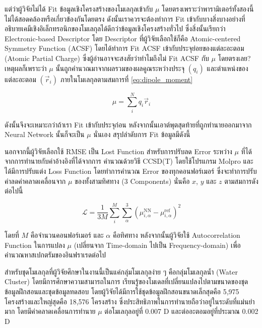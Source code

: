 แต่ว่าผู้วิจัยไม่ได้ Fit ข้อมูลเชิงโครงสร้างของโมเลกุลเข้ากับ $\mu$ โดยตรงเพราะว่าพารามิเตอร์ทั้งสองนี้ไม่ได้สอดคล้องหรือเกี่ยวข้องกันโดยตรง 
ดังนั้นเราควรจะต้องทำการ Fit เข้ากับบางสิ่งบางอย่างที่อธิบายเคมีเชิงอิเล็กทรอนิกของโมเลกุลได้ดีกว่าข้อมูลเชิงโครงสร้างทั่วไป ซึ่งสิ่งนั้นเรียกว่า 
Electronic-based Descriptor โดย Descriptor ที่ผู้วิจัยเลือกใช้ก็คือ Atomic-centered Symmetry Function (ACSF) โดยได้ทำการ 
Fit ACSF เข้ากับประจุย่อยของแต่ละอะตอม (Atomic Partial Charge) ซึ่งผู้อ่านอาจจะสงสัยว่าทำไมถึงไม่ Fit ACSF กับ $\mu$ โดยตรงเลย? 
เหตุผลก็เพราะว่า $\mu$ นั้นถูกคำนวณมาจากผลรวมของผลคูณระหว่างประจุ $(q_{i})$ และตำแหน่งของแต่ละอะตอม $(\vec{r}_{i})$ 
ภายในโมเลกุลตามสมการที่ \ref{eq:dipole_moment}

\begin{equation}\label{eq:dipole_moment}
    \mu = \sum^{N}_{i} q_{i}\vec{r}_{i}
\end{equation}

\noindent ดังนั้นจึงจะเหมาะกว่าถ้าเรา Fit เข้ากับประจุก่อน หลังจากนั้นเอาต์พุตสุดท้ายที่ถูกทำนายออกมาจาก Neural Network นั้นก็จะเป็น 
$\mu$ นั่นเอง สรุปลำดับการ Fit ข้อมูลมีดังนี้ 


นอกจากนี้ผู้วิจัยเลือกใช้ RMSE เป็น Lost Function สำหรับการปรับลด Error ระหว่าง $\mu$ ที่ได้จากการทำนายกับค่าอ้างอิงที่ได้จากการ%
คำนวณด้วยวิธี CCSD(T) โดยใช้โปรแกรม Molpro และได้มีการปรับแต่ง Loss Function โดยทำการคำนวณ Error ของทุกคอนฟอร์เมอร์ 
ซึ่งจะทำการปรับค่าลดค่าคลาดเคลื่อนจาก $\mu$ ของทั้งสามทิศทาง (3 Components) นั่นคือ $x$, $y$ และ $z$ ตามสมการดังต่อไปนี้

\begin{equation}
    \mathcal{L} = \frac{1}{3M} \sum^{M}_{i} \sum^{3}_{\alpha} (\mu^{\text{NN}}_{i,\alpha} 
    - \mu^{\text{ref}}_{i,\alpha})^{2}
\end{equation}

\noindent โดยที่ $M$ คือจำนวนคอนฟอร์เมอร์ และ $\alpha$ คือทิศทาง หลังจากนั้นผู้วิจัยใช้ Autocorrelation Function ในการแปลง 
$\mu$ (เปลี่ยนจาก Time-domain ไปเป็น Frequency-domain) เพื่อคำนวณหาสเปกตรัมของอินฟราเรดต่อไป 

สำหรับชุดโมเลกุลที่ผู้วิจัยศึกษาในงานนี้เป็นแค่กลุ่มโมเลกุลง่าย ๆ คือกลุ่มโมเลกุลน้ำ (Water Cluster) โดยมีการศึกษาความสามารถในการ%
เรียนรู้ของโมเดลที่เปลี่ยนแปลงไปตามขนาดของชุดข้อมูลฝึกสอนและชุดข้อมูลทดสอบ โดยผู้วิจัยได้มีการใช้ชุดข้อมูลฝึกสอนขนาดเล็กสุดคือ 5,975 
โครงสร้างและใหญ่สุดคือ 18,576 โครงสร้าง ซึ่งประสิทธิภาพในการทำนายถือว่าอยู่ในระดับที่แม่นยำมาก โดยมีค่าคลาดเคลื่อนการทำนาย $\mu$ 
ต่อโมเลกุลอยู่ที่ 0.007 D และต่ออะตอมอยู่ที่ประมาณ 0.002 D

